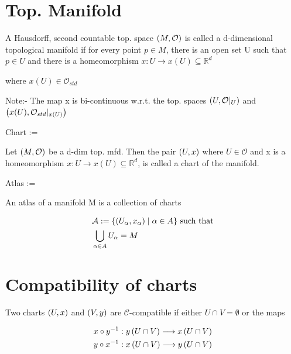 \section{Top. Manifold}

A Hausdorff, second countable top. space $ \left(  M, \mathcal{O} \right)$ is called a d-dimensional topological manifold if for every point $ p \in M$, there is an open set U such that $ p \in U$ and there is a homeomorphism $ x: U \longrightarrow x(U) \subseteq \mathbb{R}^d$

where $ x(U) \in \mathcal{O}_{std}$

Note:- The map x is bi-continuous w.r.t. the top. spaces $ \left(  U, \mathcal{O}|_U \right)$ and $ \left(  x(U), \mathcal{O}_{std}|_{x(U)} \right)$

\begin{definition}
    Chart :=

    Let $ \left(  M, \mathcal{O} \right)$ be a d-dim top. mfd. Then the pair $ \left(  U, x \right)$ where $ U \in \mathcal{O}$ and x is a homeomorphism $ x: U \longrightarrow x(U) \subseteq \mathbb{R}^d$, is called a chart of the manifold.
\end{definition}

\begin{definition}
    Atlas :=

    An atlas of a manifold M is a collection of charts

    \begin{align*}
        & \mathcal{A} := \{ \left(  U_\alpha, x_\alpha \right) \mid \alpha \in A \} \text{ such that} \\
        & \bigcup_{\alpha \in A} U_\alpha = M \\
    \end{align*}
\end{definition}

\section{Compatibility of charts}

Two charts $ \left(  U,x \right)$ and $ \left(  V,y \right)$ are $ \mathcal{C}$-compatible if either $ U \cap V = \emptyset$ or the maps

\begin{align*}
    & x \circ y^{-1} : y \left(  U \cap V \right) \longrightarrow x \left(  U \cap V \right) \\
    & y \circ x^{-1} : x \left(  U \cap V \right) \longrightarrow y \left(  U \cap V \right) \\
\end{align*}

